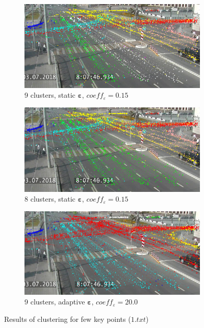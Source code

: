\begin{figure}[!htb]
	\centering
	\begin{subfigure}[!htb]{0.5\textwidth}
		\centering{}
		\includegraphics[width=\textwidth]{images/few-kp-cl-st-9.png}
		\caption{9 clusters, static $\bm{\varepsilon}$, $coeff_\varepsilon = 0.15$}
	\end{subfigure}
	\hfill
	\begin{subfigure}[!htb]{0.48\textwidth}
		\centering{}
		\includegraphics[width=\textwidth]{images/few-kp-cl-st-8.png}
		\caption{8 clusters, static $\bm{\varepsilon}$, $coeff_\varepsilon = 0.15$}
	\end{subfigure}	
	\hfill
	\begin{subfigure}[!htb]{0.48\textwidth}
		\centering{}
		\includegraphics[width=\textwidth]{images/few-kp-cl-ad-9.png}
		\caption{9 clusters, adaptive $\bm{\varepsilon}$, $coeff_\varepsilon = 20.0$}
	\end{subfigure}	
	\caption{Results of clustering for few key points ($1.txt$)}
	\label{fig:few_kp_cl}
\end{figure}

